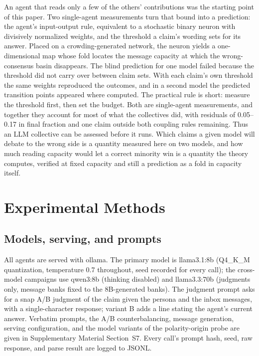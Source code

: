 \documentclass{ieeeaccess}
\begin{document}
An agent that reads only a few of the others' contributions was the
starting point of this paper. Two single-agent measurements turn that bound
into a prediction: the agent's input-output rule, equivalent to a
stochastic binary neuron with divisively normalized weights, and the
threshold a claim's wording sets for its answer. Placed on a
crowding-generated network, the neuron yields a one-dimensional map whose
fold locates the message capacity at which the wrong-consensus basin
disappears. The blind prediction for one model failed because the threshold
did not carry over between claim sets. With each claim's own threshold the
same weights reproduced the outcomes, and in a second model the predicted
transition points appeared where computed. The practical rule is short:
measure the threshold first, then set the budget. Both are single-agent
measurements, and together they account for most of what the collectives
did, with residuals of 0.05--0.17 in final fraction and one claim outside
both coupling rules remaining. Thus an LLM collective can be assessed
before it runs. Which claims a given model will debate to the wrong side is
a quantity measured here on two models, and how much reading capacity would
let a correct minority win is a quantity the theory computes, verified at
fixed capacity and still a prediction as a fold in capacity itself.


\appendices
\section{Experimental Methods}\label{app:methods}

\subsection{Models, serving, and prompts}

All agents are served with ollama. The primary model is llama3.1:8b
(Q4\_K\_M quantization, temperature 0.7 throughout, seed recorded for every
call); the cross-model campaigns use qwen3:8b (thinking disabled) and
llama3.3:70b (judgments only, message banks fixed to the 8B-generated banks).
The judgment prompt asks for a snap A/B judgment of the claim given the
persona and the inbox messages, with a single-character response; variant B
adds a line stating the agent's current answer. Verbatim prompts, the A/B
counterbalancing, message generation, serving configuration, and the model
variants of the polarity-origin probe are given in Supplementary Material Section~S7. Every
call's prompt hash, seed, raw response, and parse result are logged to JSONL.
\end{document}
